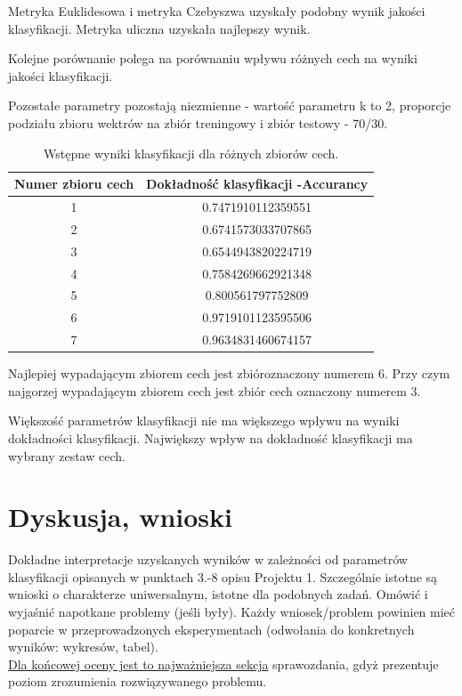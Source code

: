 \documentclass{classrep}
\begin{document}
Metryka Euklidesowa i metryka Czebyszwa uzyskały podobny wynik jakości klasyfikacji. Metryka uliczna uzyskała najlepszy wynik. 


Kolejne porównanie polega na porównaniu wpływu różnych cech na wyniki jakości klasyfikacji. 

Pozostałe parametry pozostają niezmienne - wartość parametru k to 2, proporcje podziału zbioru wektrów na zbiór treningowy i zbiór testowy - 70/30. 

\begin{table}[h!]
 \caption{Wstępne wyniki klasyfikacji dla różnych zbiorów cech.}
 \centering
 \vspace{0.1cm}
 \begin{tabular}{c c}
  \textbf{Numer zbioru cech} & \textbf{Dokładność klasyfikacji -Accurancy}\\
\hline
  1 & 0.7471910112359551\\
  2 &  0.6741573033707865\\
  3 &  0.6544943820224719\\
  4 & 0.7584269662921348\\
5 & 0.800561797752809\\
6 &0.9719101123595506\\
7 &0.9634831460674157\\
 \end{tabular}
 \label{wyniki klasyfikacji dla roznych 10 wartosci parametru k}
\end{table}

Najlepiej wypadającym zbiorem cech jest zbióroznaczony numerem 6. Przy czym najgorzej wypadającym zbiorem cech jest zbiór cech oznaczony numerem 3. 

Większość parametrów klasyfikacji nie ma większego wpływu na wyniki dokładności klasyfikacji. Największy wpływ na dokładność klasyfikacji ma wybrany zestaw cech. 


\section{Dyskusja, wnioski}

Dokładne interpretacje uzyskanych wyników w zależności od parametrów klasyfikacji
opisanych w punktach 3.-8 opisu Projektu 1. 
Szczególnie istotne są wnioski o charakterze uniwersalnym, istotne dla podobnych zadań. 
Omówić i wyjaśnić napotkane problemy (jeśli były). Każdy wniosek/problem powinien mieć poparcie
w przeprowadzonych eksperymentach (odwołania do konkretnych wyników: wykresów,
tabel). \\
\underline{Dla końcowej oceny jest to najważniejsza sekcja} sprawozdania, gdyż prezentuje poziom
zrozumienia rozwiązywanego problemu.\\
\end{document}
